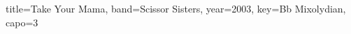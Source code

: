 \documentclass{skrul-leadsheet}
\begin{document}
\begin{song}[transpose-capo=true]{title={Take Your Mama}, band={Scissor Sisters}, year={2003}, key={Bb Mixolydian}, capo={3}}



\end{song}
\end{document}

